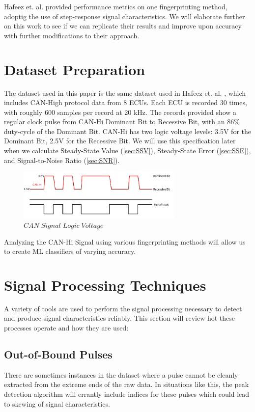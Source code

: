 \documentclass[conference]{IEEEtran}
\begin{document}
Hafeez et. al. \cite{hafeez2019} provided performance metrics on one fingerprinting method, adoptig the use of step-response signal characteristics. We will elaborate further on this work to see if we can replicate their results and improve upon accuracy with further modifications to their approach.



\section{Dataset Preparation}

The dataset used in this paper is the same dataset used in Hafeez et. al. \cite{hafeez2019}, which includes CAN-High protocol data from 8 ECUs. Each ECU is recorded 30 times, with roughly 600 samples per record at 20 kHz. The records provided show a regular clock pulse from CAN-Hi Dominant Bit to Recessive Bit, with an 86\% duty-cycle of the Dominant Bit. CAN-Hi has two logic voltage levels: 3.5V for the Dominant Bit, 2.5V for the Recessive Bit. We will use this specification later when we calculate Steady-State Value (\ref{sec:SSV}), Steady-State Error (\ref{sec:SSE}), and Signal-to-Noise Ratio (\ref{sec:SNR}).

\begin{figure}[htb]
\centering
\includegraphics[width=3.2in]{figures/02_can_hi.png}
\caption{$CAN  \; Signal \; Logic  \; Voltage$}
\label{fig:CANBitLogic}
\end{figure}

Analyzing the CAN-Hi Signal using various fingerprinting methods will allow us to create ML classifiers of varying accuracy.



\section{Signal Processing Techniques}

A variety of tools are used to perform the signal processing necessary to detect and produce signal characteristics reliably. This section will review hot these processes operate and how they are used:

\subsection{Out-of-Bound Pulses}  \label{sec:OoBP}
There are sometimes instances in the dataset where a pulse cannot be cleanly extracted from the extreme ends of the raw data. In situations like this, the peak detection algorithm will errantly include indices for these pulses which could lead to skewing of signal characteristics.
\end{document}
